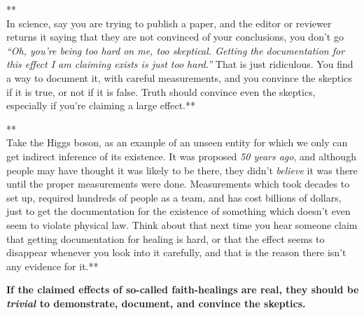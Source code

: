 **\\In science, say you are trying to publish a paper, and the editor or
reviewer returns it saying that they are not convinced of your
conclusions, you don't go \emph{``Oh, you're being too hard on me, too
skeptical. Getting the documentation for this effect I am claiming
exists is just too hard.''} That is just ridiculous. You find a way to
document it, with careful measurements, and you convince the skeptics if
it is true, or not if it is false. Truth should convince even the
skeptics, especially if you're claiming a large effect.**

**\\Take the Higgs boson, as an example of an unseen entity for which we
only can get indirect inference of its existence. It was proposed
\emph{50 years ago}, and although people may have thought it was likely
to be there, they didn't \emph{believe} it was there until the proper
measurements were done. Measurements which took decades to set up,
required hundreds of people as a team, and has cost billions of dollars,
just to get the documentation for the existence of something which
doesn't even seem to violate physical law. Think about that next time
you hear someone claim that getting documentation for healing is hard,
or that the effect seems to disappear whenever you look into it
carefully, and that is the reason there isn't any evidence for it.**

\textbf{If the claimed effects of so-called faith-healings are real,
they should be \emph{trivial} to demonstrate, document, and convince the
skeptics.}
